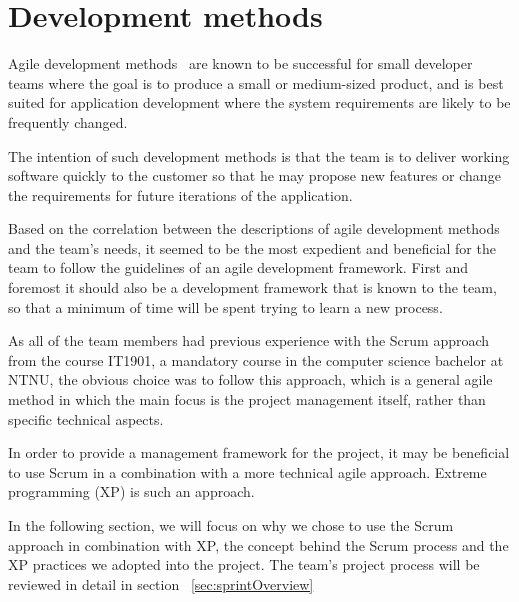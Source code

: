 \section{Development methods}

Agile development methods~\cite{scrum} are known to be successful for small developer teams where the goal is to produce a small or medium-sized product, and is best suited for application development where the system requirements are likely to be frequently changed.

The intention of such development methods is that the team is to deliver working software quickly to the customer so that he may propose new features or change the requirements for future iterations of the application.

Based on the correlation between the descriptions of agile development methods and the team's needs, it seemed to be the most expedient and beneficial for the team to follow the guidelines of an agile development framework. First and foremost it should also be a development framework that is known to the team, so that a minimum of time will be spent trying to learn a new process.

As all of the team members had previous experience with the Scrum approach from the course IT1901, a mandatory course in the computer science bachelor at NTNU, the obvious choice was to follow this approach, which is a general agile method in which the main focus is the project management itself, rather than specific technical aspects.

In order to provide a management framework for the project, it may be beneficial to use Scrum in a combination with a more technical agile approach. Extreme programming (XP) is such an approach.

In the following section, we will focus on why we chose to use the Scrum approach in combination with XP, the concept behind the Scrum process and the XP practices we adopted into the project. The team's project process will be reviewed in detail in section ~\ref{sec:sprintOverview}